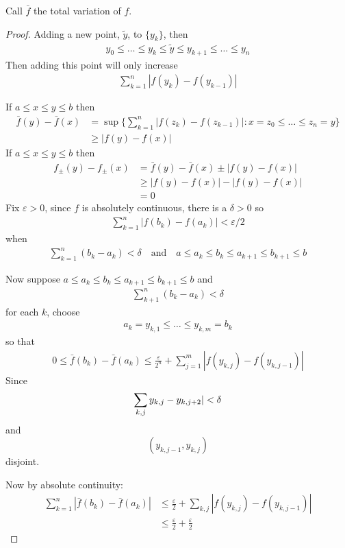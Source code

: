 \begin{notation}
	Call $\bar{f}$ the total variation of $f$.
\end{notation}

\begin{proof}
	Adding a new point, $\tilde{y}$, to $\{y_{k}\}$, then 
	\begin{align*}
		y_0 \leq \ldots \leq y_k \leq \tilde{y} \leq y_{k+1} \leq \ldots \leq y_n
	\end{align*} 
	Then adding this point will only increase
	\begin{align*}
		\sum_{k=1}^n | f( y_k) - f(y_{k-1}) |
	\end{align*} 

	If $a \leq x \leq y \leq b$ then
	\begin{align*}
		\bar{f} (y) - \bar{f}(x) &= \sup \{\sum_{k=1}^{n} |f (z_k) - f (z_{k - 1}) | : x = z_0 \leq \ldots \leq z_n = y \} \\
								 &\geq | f(y) - f(x) |
	\end{align*} 
	If $a \leq x \leq y \leq b$ then
	 \begin{align*}
		 f_{\pm} (y) - f_{\pm} (x) &= \bar{f} (y) - \bar{f} (x) \pm | f(y) - f(x) | \\
								   &\geq |f(y) - f(x) | - | f(y) - f(x)| \\
								   &= 0
	\end{align*} 
	Fix $\varepsilon > 0$, since $f$ is absolutely continuous, there is a $\delta > 0$ so 
	\begin{align*}
		\sum_{k=1}^n | f (b_{k}) - f (a_k) | < \varepsilon/2
	\end{align*} when
	\begin{align*}
		\sum_{k=1}^n (b_k - a_k) < \delta \quad \text{and} \quad a \leq a_k \leq b_k \leq a_{k+1} \leq b_{k+1} \leq b
	\end{align*} 


	Now suppose $a \leq a_k \leq b_k \leq a_{k+1} \leq b_{k+1} \leq b$ 
	and
	\begin{align*}
		\sum_{k+1}^n (b_k - a_k) < \delta
	\end{align*} 
	for each $k$, choose
	\begin{align*}
		a_k = y_{k,1} \leq \ldots \leq y_{k, m} = b_k
	\end{align*} so that
	\begin{align*}
		0 \leq \bar{f}(b_k) - \bar{f} (a_k) \leq \frac{\varepsilon}{2^{n}} + \sum_{j=1}^m |f(y_{k,j}) - f(y_{k, j-1}) |
	\end{align*} 
	Since 
	\[
		\sum_{k,j} y_{k,j} - y_{k,j+2} | < \delta \\
	\] and
	\[
		(y_{k, j-1}, y_{k,j})
	\] disjoint.

	Now by absolute continuity:
	\begin{align*}
		\sum_{k=1}^{n} | \bar{f}(b_k) - \bar{f}(a_k) | &\leq \frac{\varepsilon}{2} + \sum_{k,j} |f (y_{k,j}) - f(y_{k,j-1}) | \\
													   &\leq \frac{\varepsilon}{2} + \frac{\varepsilon}{2}
	\end{align*} 

\end{proof}

